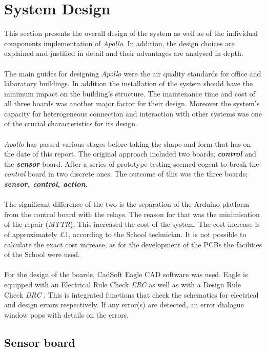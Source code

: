 \documentclass[12pt,a4paper]{report}
\begin{document}
\chapter{System Design}
This section presents the overall design of the system as well as of the individual components implementation of \emph{Apollo}. In addition, the design choices are explained and justified in detail and their advantages are analysed in depth.\\
\ \\
The main guides for designing \emph{Apollo} were the air quality standards for office and laboratory buildings. In addition the installation of the system should have the minimum impact on the building's structure. The maintenance time and cost of all three boards was another major factor for their design. Moreover the system's capacity for heterogeneous connection and interaction with other systems was one of the crucial characteristics for its design. \\
\ \\
\emph{Apollo} has passed various stages before taking the shape and form that has on the date of this report. The original approach included two boards; \textbf{\textit{control}} and the \textbf{\textit{sensor}} board. After a series of prototype testing seemed cogent to break the \textit{control} board in two discrete ones. The outcome of this was the three boards; \textbf{\textit{sensor, control, action}}.\\
\ \\
The significant difference of the two is the separation of the Arduino platform from the control board with the relays. The reason for that was the minimisation of the repair (\textit{MTTR}). This increased the cost of the system. The cost increase is of approximately £1, according to the School technician. It is not possible to calculate the exact cost increase, as for the development of the PCBs the facilities of the School were used.\\
\ \\
For the design of the boards, CadSoft Eagle CAD software was used. Eagle is equipped with an Electrical Rule Check \textit{ERC} as well as with a Design Rule Check \textit{DRC} . This is integrated functions that check the schematics for electrical and design errors respectively. If any error(s) are detected, an error dialogue window pops with details on the errors.
%
\section{Sensor board}
\end{document}
